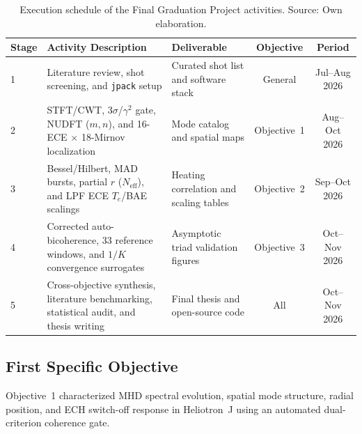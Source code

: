 \begin{table}[H]
\centering
\scriptsize
\setlength{\tabcolsep}{3pt}
\renewcommand{\arraystretch}{0.82}
\caption[Execution schedule of the Final Graduation Project activities]{Execution schedule of the Final Graduation Project activities. Source: Own elaboration.}
\label{tab:work_schedule}
\begin{tabularx}{\textwidth}{@{}l >{\raggedright\arraybackslash}X >{\raggedright\arraybackslash}p{3.0cm} c c@{}}
\toprule
Stage & Activity Description & Deliverable & Objective & Period \\
\midrule
1 & Literature review, shot screening, and \texttt{jpack} setup & Curated shot list and software stack & General & Jul--Aug 2026 \\
2 & STFT/CWT, $3\sigma$/$\gamma^2$ gate, NUDFT ($m,n$), and 16-ECE $\times$ 18-Mirnov localization & Mode catalog and spatial maps & Objective~1 & Aug--Oct 2026 \\
3 & Bessel/Hilbert, MAD bursts, partial $r$ ($N_{\mathrm{eff}}$), and LPF ECE $T_e$/BAE scalings & Heating correlation and scaling tables & Objective~2 & Sep--Oct 2026 \\
4 & Corrected auto-bicoherence, 33 reference windows, and $1/K$ convergence surrogates & Asymptotic triad validation figures & Objective~3 & Oct--Nov 2026 \\
5 & Cross-objective synthesis, literature benchmarking, statistical audit, and thesis writing & Final thesis and open-source code & All & Oct--Nov 2026 \\
\bottomrule
\end{tabularx}
\end{table}

\subsection{First Specific Objective}
Objective~1 characterized MHD spectral evolution, spatial mode structure, radial position, and ECH switch-off response in Heliotron~J \cite{nagasaki2020heliotron, Yamamoto_2020} using an automated dual-criterion coherence gate.

